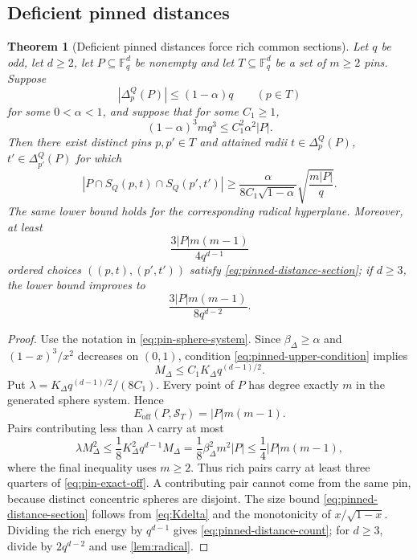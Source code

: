 \documentclass[11pt,letterpaper]{amsart}
\newtheorem{theorem}{Theorem}[section]
\theoremstyle{definition}
\theoremstyle{remark}
\newcommand{\1}{\mathbf 1}
\begin{document}
\subsection{Deficient pinned distances}

\begin{theorem}[Deficient pinned distances force rich common sections]\label{thm:pinned-distance}
Let $q$ be odd, let $d\ge2$, let $P\subseteq\mathbb F_q^d$ be nonempty and let $T\subseteq\mathbb F_q^d$ be a set of $m\ge2$ pins.  Suppose
\[
 |\Delta_p^Q(P)|\le(1-\alpha)q
 \qquad(p\in T)
\]
for some $0<\alpha<1$, and suppose that for some $C_1\ge1$,
\begin{equation}\label{eq:pinned-upper-condition}
 (1-\alpha)^3mq^3
 \le C_1^2\alpha^2|P|.
\end{equation}
Then there exist distinct pins $p,p'\in T$ and attained radii $t\in\Delta_p^Q(P)$, $t'\in\Delta_{p'}^Q(P)$ for which
\begin{equation}\label{eq:pinned-distance-section}
 |P\cap S_Q(p,t)\cap S_Q(p',t')|
 \ge
 \frac{\alpha}{8C_1\sqrt{1-\alpha}}
 \sqrt{\frac{m|P|}{q}}.
\end{equation}
The same lower bound holds for the corresponding radical hyperplane.  Moreover, at least
\begin{equation}\label{eq:pinned-distance-count}
 \frac{3|P|m(m-1)}{4q^{d-1}}
\end{equation}
ordered choices $((p,t),(p',t'))$ satisfy \eqref{eq:pinned-distance-section}; if $d\ge3$, the lower bound improves to
\begin{equation}\label{eq:pinned-distance-count-d3}
 \frac{3|P|m(m-1)}{8q^{d-2}}.
\end{equation}
\end{theorem}

\begin{proof}
Use the notation in \eqref{eq:pin-sphere-system}.  Since $\beta_\Delta\ge\alpha$ and $(1-x)^3/x^2$ decreases on $(0,1)$, condition \eqref{eq:pinned-upper-condition} implies
\[
 M_\Delta\le C_1K_\Delta q^{(d-1)/2}.
\]
Put $\lambda=K_\Delta q^{(d-1)/2}/(8C_1)$.  Every point of $P$ has degree exactly $m$ in the generated sphere system.  Hence
\begin{equation}\label{eq:pin-exact-off}
 E_{\mathrm{off}}(P,\mathcal S_T)=|P|m(m-1).
\end{equation}
Pairs contributing less than $\lambda$ carry at most
\[
 \lambda M_\Delta^2
 \le\frac18K_\Delta^2q^{d-1}M_\Delta
 =\frac18\beta_\Delta^2m^2|P|
 \le\frac14|P|m(m-1),
\]
where the final inequality uses $m\ge2$.  Thus rich pairs carry at least three quarters of \eqref{eq:pin-exact-off}.  A contributing pair cannot come from the same pin, because distinct concentric spheres are disjoint.  The size bound \eqref{eq:pinned-distance-section} follows from \eqref{eq:Kdelta} and the monotonicity of $x/\sqrt{1-x}$.  Dividing the rich energy by $q^{d-1}$ gives \eqref{eq:pinned-distance-count}; for $d\ge3$, divide by $2q^{d-2}$ and use \cref{lem:radical}.
\end{proof}
\end{document}
